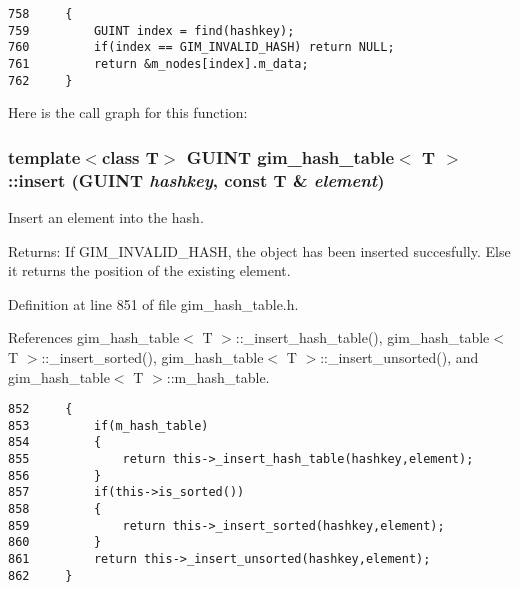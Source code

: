 \begin{Code}\begin{verbatim}758     {
759         GUINT index = find(hashkey);
760         if(index == GIM_INVALID_HASH) return NULL;
761         return &m_nodes[index].m_data;
762     }
\end{verbatim}
\end{Code}




Here is the call graph for this function:\hypertarget{classgim__hash__table_ff0e9bdb5bd6aacf9272db6789c514f7}{
\subsubsection[insert]{\setlength{\rightskip}{0pt plus 5cm}template$<$class T$>$ GUINT {\bf gim\_\-hash\_\-table}$<$ T $>$::insert (GUINT {\em hashkey}, \/  const T \& {\em element})}}
\label{classgim__hash__table_ff0e9bdb5bd6aacf9272db6789c514f7}


Insert an element into the hash. 

\begin{Desc}
\item[Returns:]If GIM\_\-INVALID\_\-HASH, the object has been inserted succesfully. Else it returns the position of the existing element. \end{Desc}


Definition at line 851 of file gim\_\-hash\_\-table.h.

References gim\_\-hash\_\-table$<$ T $>$::\_\-insert\_\-hash\_\-table(), gim\_\-hash\_\-table$<$ T $>$::\_\-insert\_\-sorted(), gim\_\-hash\_\-table$<$ T $>$::\_\-insert\_\-unsorted(), and gim\_\-hash\_\-table$<$ T $>$::m\_\-hash\_\-table.

\begin{Code}\begin{verbatim}852     {
853         if(m_hash_table)
854         {
855             return this->_insert_hash_table(hashkey,element);
856         }
857         if(this->is_sorted())
858         {
859             return this->_insert_sorted(hashkey,element);
860         }
861         return this->_insert_unsorted(hashkey,element);
862     }
\end{verbatim}
\end{Code}




